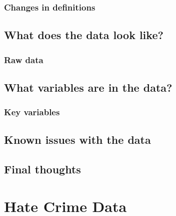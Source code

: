 \documentclass[
  12pt,
  openany]{book}
\begin{document}
\hypertarget{changes-in-definitions-3}{%
\subsection{Changes in definitions}\label{changes-in-definitions-3}}

\hypertarget{what-does-the-data-look-like-3}{%
\section{What does the data look like?}\label{what-does-the-data-look-like-3}}

\hypertarget{raw-data-1}{%
\subsection{Raw data}\label{raw-data-1}}

\hypertarget{what-variables-are-in-the-data-3}{%
\section{What variables are in the data?}\label{what-variables-are-in-the-data-3}}

\hypertarget{key-variables-3}{%
\subsection{Key variables}\label{key-variables-3}}

\hypertarget{known-issues-with-the-data-3}{%
\section{Known issues with the data}\label{known-issues-with-the-data-3}}

\hypertarget{final-thoughts-3}{%
\section{Final thoughts}\label{final-thoughts-3}}

\hypertarget{hate_crimes}{%
\chapter{Hate Crime Data}\label{hate_crimes}}
\end{document}
